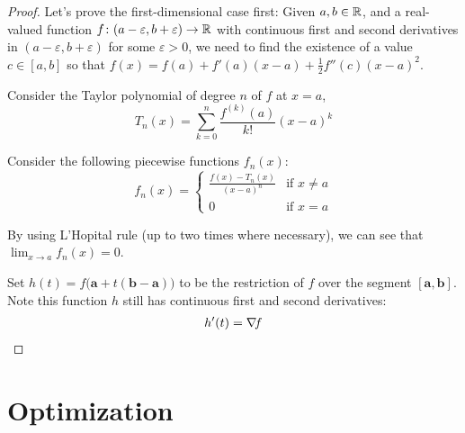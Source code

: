 \begin{proof}
Let's prove the first-dimensional case first:  Given $a,b \in \mathbb{R}$, and a real-valued function $f\colon (a-\varepsilon, b+\varepsilon) \to \mathbb{R}$ with continuous first and second derivatives in $(a-\varepsilon, b+\varepsilon)$ for some $\varepsilon>0$, we need to find the existence of a value $c \in [a,b]$ so that $f(x) = f(a) + f'(a)(x-a) + \tfrac{1}{2}f''(c)(x-a)^2$.

Consider the Taylor polynomial of degree $n$ of $f$ at $x=a$, 
\begin{equation*}
T_n(x) = \sum_{k=0}^n \frac{f^{(k)}(a)}{k!}(x-a)^k
\end{equation*}

Consider the following piecewise functions $f_n(x)$:
\begin{equation*}
f_n(x) = \begin{cases} 
\frac{f(x) - T_n(x)}{(x-a)^n} &\text{if }x\neq a \\
0 &\text{if }x=a
\end{cases}
\end{equation*}

By using L'Hopital rule (up to two times where necessary), we can see that $\lim_{x \to a} f_n(x) = 0$. 

Set $h(t) = f\big(\boldsymbol{a} + t (\boldsymbol{b} - \boldsymbol{a}) \big)$ to be the restriction of $f$ over the segment $[\boldsymbol{a},\boldsymbol{b}]$.  Note this function $h$ still has continuous first and second derivatives:
\begin{align*}
	h'(t) = \mathop{\nabla\! {f}}
\end{align*}
\end{proof}

\section{Optimization}



